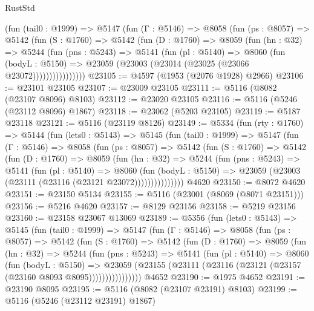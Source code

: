 \begin{lexlean}{RustStd}
\begin{coremodule}
{\begin{coremodule}
{{{{{{{{{{{{{{{{{{{{{{{{{{{{{{{          (fun (tail0 : @1999) =>
          @5147
            (fun (Γ : @5146) =>
            @8058
              (fun (ps : @8057) =>
              @5142
                (fun (S : @1760) =>
                @5142
                  (fun (D : @1760) =>
                  @8059
                    (fun (hn : @32) =>
                    @5244
                      (fun (pns : @5243) =>
                      @5141
                        (fun (pl : @5140) =>
                        @8060
                          (fun (bodyL : @5150) =>
                          @23059 (@23003 (@23014 (@23025 (@23066 @23072))))))))))))))))
@23105 := @4597 (@1953 (@2076 @1928) @2966)
@23106 := @23101 @23105
@23107 := @23009 @23105
@23111 := @5116 (@8082 (@23107 @8096) @8103)
@23112 := @23020 @23105
@23116 := @5116 (@5246 (@23112 @8096) @1867)
@23118 := @23062 (@5203 @23105)
@23119 := @5187 @23118
@23121 := @5116 (@23119 @8126)
@23149 := @5334
    (fun (rty : @1760) =>
    @5144
      (fun (lets0 : @5143) =>
      @5145
        (fun (tail0 : @1999) =>
        @5147
          (fun (Γ : @5146) =>
          @8058
            (fun (ps : @8057) =>
            @5142
              (fun (S : @1760) =>
              @5142
                (fun (D : @1760) =>
                @8059
                  (fun (hn : @32) =>
                  @5244
                    (fun (pns : @5243) =>
                    @5141
                      (fun (pl : @5140) =>
                      @8060
                        (fun (bodyL : @5150) =>
                        @23059 (@23003 (@23111 (@23116 (@23121 @23072)))))))))))))))
    @4620
@23150 := @8072 @4620
@23151 := @23150 @5134
@23155 := @5116 (@23001 (@8069 (@8071 @23151)))
@23156 := @5216 @4620
@23157 := @8129 @23156
@23158 := @5219 @23156
@23160 := @23158 @23067 @13069
@23189 := @5356
    (fun (lets0 : @5143) =>
    @5145
      (fun (tail0 : @1999) =>
      @5147
        (fun (Γ : @5146) =>
        @8058
          (fun (ps : @8057) =>
          @5142
            (fun (S : @1760) =>
            @5142
              (fun (D : @1760) =>
              @8059
                (fun (hn : @32) =>
                @5244
                  (fun (pns : @5243) =>
                  @5141
                    (fun (pl : @5140) =>
                    @8060
                      (fun (bodyL : @5150) =>
                      @23059
                        (@23155 (@23111 (@23116 (@23121 (@23157 (@23160 @8093 @8095))))))))))))))))
    @4652
@23190 := @1975 @4652
@23191 := @23190 @8095
@23195 := @5116 (@8082 (@23107 @23191) @8103)
@23199 := @5116 (@5246 (@23112 @23191) @1867)
}}}}}}}}}}}}}}}}}}}}}}}}}}}}}}}
\end{coremodule}}
\end{coremodule}
\end{lexlean}
